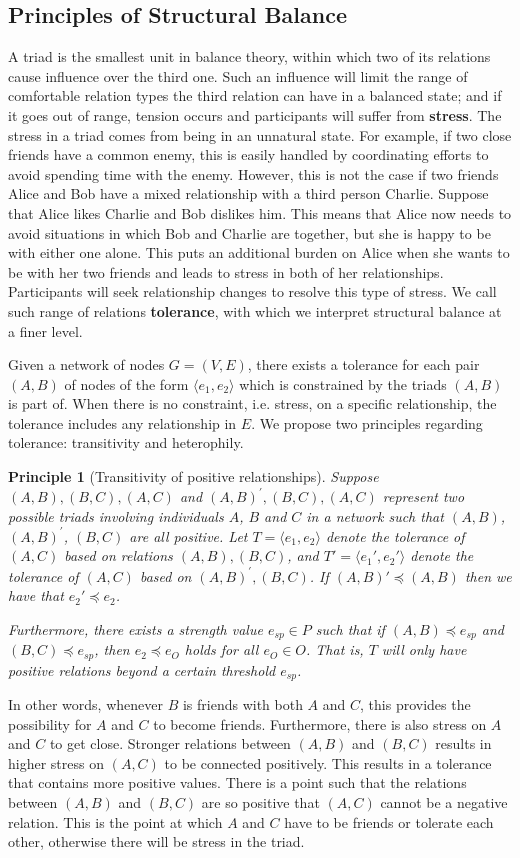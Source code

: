 \documentclass[acmtweb]{acmsmall}
\newtheorem{principle}{Principle}
\newcommand{\tuple}[2] {\langle #1,#2\rangle}
\begin{document}
\subsection{Principles of Structural Balance}
A triad is the smallest unit in balance theory, within which two of
its relations cause influence over the third one.  Such an influence
will limit the range of comfortable relation types the third relation
can have in a balanced state; and if it goes out of range, tension
occurs and participants will suffer from {\bf stress}. The stress in a
triad comes from being in an unnatural state. For example, if two
close friends have a common enemy, this is easily handled by
coordinating efforts to avoid spending time with the enemy.  However,
this is not the case if two friends Alice and Bob have a mixed
relationship with a third person Charlie. Suppose that Alice likes
Charlie and Bob dislikes him. This means that Alice now needs to avoid
situations in which Bob and Charlie are together, but she is happy to
be with either one alone. This puts an additional burden on Alice when
she wants to be with her two friends and leads to stress in both of
her relationships. Participants will seek relationship changes to
resolve this type of stress. We call such range of relations {\bf
  tolerance}, with which we interpret structural balance at a finer
level.

Given a network of nodes $G=(V,E)$, there exists a tolerance for each
pair $(A,B)$ of nodes of the form $\tuple{e_1}{e_2}$ which is
constrained by the triads $(A,B)$ is part of. When there is no
constraint, i.e. stress, on a specific relationship, the tolerance
includes any relationship in $E$. We propose two principles regarding
tolerance: transitivity and heterophily.

\begin{principle}[Transitivity of positive relationships]
Suppose $(A,B),(B,C),(A,C)$ and $(A,B)^{'},(B,C),(A,C)$ represent two
possible triads involving individuals $A$, $B$ and $C$ in a network
such that $(A,B)$, $(A,B)^{'}$, $(B,C)$ are all positive. Let
$T=\tuple{e_1}{e_2}$ denote the tolerance of $(A,C)$ based on
relations $(A,B),(B,C)$, and $T'=\tuple{e_1'}{e_2'}$ denote the
tolerance of $(A,C)$ based on $(A,B)^{'},(B,C)$. If $(A,B)' \preceq
(A,B)$ then we have that $e_2'\preceq e_2$.

Furthermore, there exists a strength value $e_{sp} \in P$ such that if
$(A,B)\preceq e_{sp}$ and $(B,C) \preceq e_{sp}$, then $e_{2} \preceq
e_{O}$ holds for all $e_{O} \in O$. That is, $T$ will only have
positive relations beyond a certain threshold $e_{sp}$.
\end{principle}
In other words, whenever $B$ is friends with both $A$ and $C$, this
provides the possibility for $A$ and $C$ to become
friends. Furthermore, there is also stress on $A$ and $C$ to get
close.  Stronger relations between $(A,B)$ and $(B,C)$ results in
higher stress on $(A,C)$ to be connected positively. This results in a
tolerance that contains more positive values. There is a point such
that the relations between $(A,B)$ and $(B,C)$ are so positive that
$(A,C)$ cannot be a negative relation. This is the point at which $A$
and $C$ have to be friends or tolerate each other, otherwise there
will be stress in the triad.
\end{document}
